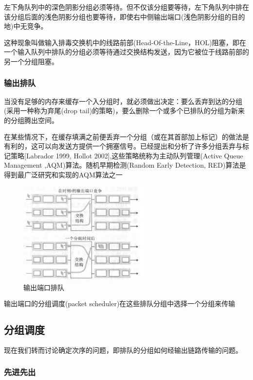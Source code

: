     左下角队列中的深色阴影分组必须等待。但不仅该分组要等待，左下角队列中排在该分组后面的浅色阴影分组也要等待，即使右中侧输出端口(浅色阴影分组的目的地)中无竞争。

    这种现象叫做输入排毒交换机中的线路前部(Head-Of-the-Line，HOL)阻塞，即在一个输入队列中排队的分组必须等待通过交换结构发送，因为它被位于线路前部的另一个分组阻塞。

\subsubsection{输出排队}

    当没有足够的内存来缓存一个入分组时，就必须做出决定：要么丢弃到达的分组(采用一种称为弃尾(drop tail)的策略)，要么删除一个或多个已排队的分组为新来的分组腾出空间。

    在某些情况下，在缓存填满之前便丢弃一个分组（或在其首部加上标记）的做法是有利的，这可以向发送方提供一个拥塞信号。已经提出和分析了许多分组丢弃与标记策略[Labrador 1999, Hollot 2002],这些策略统称为主动队列管理(Active Queue Management ,AQM)算法。随机早期检测(Random Early Detection, RED)算法是得到最广泛研究和实现的AQM算法之一

\begin{figure}[!htbp]
    \centering
    \includegraphics[width=0.6\textwidth]{image/chapter04/输出端口排队.png}
    \caption{输出端口排队}
\end{figure}

    输出端口的分组调度(packet scheduler)在这些排队分组中选择一个分组来传输

\subsection{分组调度}

    现在我们转而讨论确定次序的问题，即排队的分组如何经输出链路传输的问题。

\subsubsection{先进先出}

